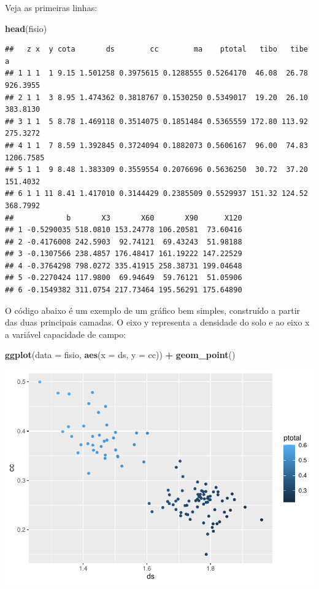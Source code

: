 \documentclass[
]{book}
\newenvironment{Shaded}{\begin{snugshade}}{\end{snugshade}}
\newcommand{\DataTypeTok}[1]{\textcolor[rgb]{0.13,0.29,0.53}{#1}}
\newcommand{\KeywordTok}[1]{\textcolor[rgb]{0.13,0.29,0.53}{\textbf{#1}}}
\newcommand{\NormalTok}[1]{#1}
\newcommand{\OperatorTok}[1]{\textcolor[rgb]{0.81,0.36,0.00}{\textbf{#1}}}
\newcommand{\StringTok}[1]{\textcolor[rgb]{0.31,0.60,0.02}{#1}}
\begin{document}
Veja as primeiras linhas:

\begin{Shaded}
\begin{Highlighting}[]
\KeywordTok{head}\NormalTok{(fisio)}
\end{Highlighting}
\end{Shaded}

\begin{verbatim}
##   z x  y cota       ds        cc        ma    ptotal   tibo   tibe         a
## 1 1 1  1 9.15 1.501258 0.3975615 0.1288555 0.5264170  46.08  26.78  926.3955
## 2 1 1  3 8.95 1.474362 0.3818767 0.1530250 0.5349017  19.20  26.10  383.8130
## 3 1 1  5 8.78 1.469118 0.3514075 0.1851484 0.5365559 172.80 113.92  275.3272
## 4 1 1  7 8.59 1.392845 0.3724094 0.1882073 0.5606167  96.00  74.83 1206.7585
## 5 1 1  9 8.48 1.383309 0.3559554 0.2076696 0.5636250  30.72  37.20  151.4032
## 6 1 1 11 8.41 1.417010 0.3144429 0.2385509 0.5529937 151.32 124.52  368.7992
##            b       X3       X60       X90      X120
## 1 -0.5290035 518.0810 153.24778 106.20581  73.60416
## 2 -0.4176008 242.5903  92.74121  69.43243  51.98188
## 3 -0.1307566 238.4857 176.48417 161.19222 147.22529
## 4 -0.3764298 798.0272 335.41915 258.38731 199.04648
## 5 -0.2270424 117.9800  69.94649  59.76121  51.05906
## 6 -0.1549382 311.0754 217.73464 195.56291 175.64890
\end{verbatim}

O código abaixo é um exemplo de um gráfico bem simples, construído a partir das duas principais camadas. O eixo y representa a densidade do solo e ao eixo x a variável capacidade de campo:

\begin{Shaded}
\begin{Highlighting}[]
\KeywordTok{ggplot}\NormalTok{(}\DataTypeTok{data =}\NormalTok{ fisio, }\KeywordTok{aes}\NormalTok{(}\DataTypeTok{x =}\NormalTok{ ds, }\DataTypeTok{y =}\NormalTok{ cc)) }\OperatorTok{+}
\StringTok{  }\KeywordTok{geom_point}\NormalTok{()}
\end{Highlighting}
\end{Shaded}

\includegraphics{TudodoR_files/figure-latex/unnamed-chunk-188-1.pdf}
\end{document}
